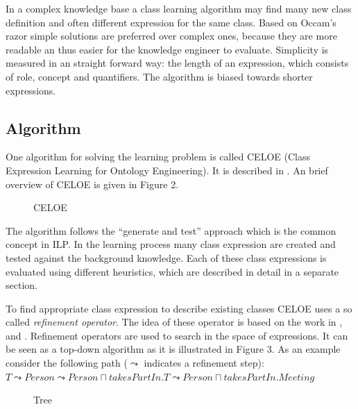 In a complex knowledge base a class learning algorithm may find many new class
definition and often different expression for the same class. Based on Occam's
razor \cite{occam-razor} simple solutions are preferred over complex ones,
because they are more readable an thus easier for the knowledge engineer to
evaluate. Simplicity is measured in an straight forward way: the length of an
expression, which consists of role, concept and quantifiers.
The algorithm is biased towards shorter expressions. \cite{paper1}

\subsection{Algorithm}
One algorithm for solving the learning problem is called CELOE (Class
Expression Learning for Ontology Engineering). It is described in \cite{paper1}.
An brief overview of CELOE is given in Figure 2.
\begin{figure}
\label{celoe}
\centering
{}
\caption{CELOE\cite{paper1}}
\end{figure}
The algorithm follows the ``generate and test'' approach which is the common
concept in ILP. \cite{Foundation_ILP} 
In the learning process many class expression are created and tested against the
background knowledge. Each of these class expressions is evaluated using
different heuristics, which are described in detail in a separate section.

To find appropriate class expression to describe existing classes CELOE uses a so
called \emph{refinement operator}. The idea of these operator is based on the
work in \cite{refinement1},\cite{refinement2} and \cite{refinement3}. Refinement
operators are used to search in the space of expressions. It can be seen as a
top-down algorithm as it is illustrated in Figure 3.
As an example consider the following path ($\leadsto$ indicates a refinement
step):\vspace{6pt}\\
$T \leadsto Person \leadsto Person \sqcap takesPartIn.T \leadsto Person \sqcap
takesPartIn.Meeting$

\begin{figure}
\label{tree}
\centering
{}
\caption{Tree\cite{paper1}}
\end{figure}


